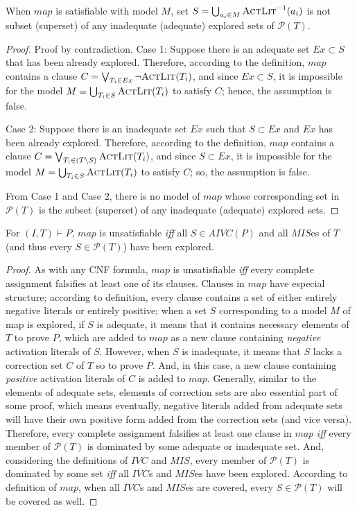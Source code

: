 \begin{lemma}
\label{lem:map:sound}
When $map$ is satisfiable with model $M$, set $S = \bigcup_{a_i \in M} \textsc{ActLit} ^{-1} (a_i)$ is not subset (superset) of any
inadequate (adequate) explored sets of $\mathcal{P}(T)$.
\end{lemma}
\begin{proof}
Proof by contradiction. Case 1: Suppose there is an adequate set $Ex \subset S$ that has been already explored. Therefore, according to the definition, $map$ contains a clause $C = \bigvee_{T_{i}\in Ex} \neg {\textsc{ActLit}(T_i)}$, and since $Ex \subset S$, it is impossible for the model $M = \bigcup_{T_i \in S} \textsc{ActLit} (T_i)$ to satisfy $C$; hence, the assumption is false.

Case 2: Suppose there is an inadequate set $Ex$ such that $S \subset Ex$ and $Ex$ has been already explored. Therefore, according to the definition, $map$ contains a clause $C = \bigvee_{T_{i}\in (T \setminus S)} \textsc{ActLit} (T_i)$, and since $S \subset Ex$, it is impossible for the model $M = \bigcup_{T_i \in S} \textsc{ActLit} (T_i)$ to satisfy $C$; so, the assumption is false.

From Case 1 and Case 2, there is no model of $map$ whose corresponding set in $\mathcal{P}(T)$ is the subset (superset) of any inadequate (adequate) explored sets.
\end{proof}


\begin{lemma}
\label{lem:map:comp}
For $(I, T) \vdash P$, $map$ is unsatisfiable \emph{iff} all $S \in AIVC(P)$ and all $MIS$es of $T$ (and thus every $S \in \mathcal{P}(T)$) have been explored.
\end{lemma}
\begin{proof}
As with any CNF formula, $map$ is unsatisfiable \emph{iff} every complete assignment falsifies at least one of its clauses. Clauses in $map$ have especial structure;
according to definition, every clause contains a set of either entirely negative literals or entirely positive; when a set $S$ corresponding to a model $M$ of map is explored, if $S$ is adequate, it means that it contains necessary elements of $T$ to prove $P$, which
are added to $map$ as a new clause containing \emph{negative} activation literals of $S$. However, when
$S$ is inadequate, it means that $S$ lacks a correction set $C$ of $T$ so to prove $P$.
And, in this case, a new clause containing \emph{positive} activation literals of $C$ is added to $map$. Generally, similar to the elements of adequate sets, elements of correction sets are also essential part of some proof, which means eventually, negative literals added from adequate sets will have their own  positive form added from the correction sets (and vice versa).
Therefore, every complete assignment falsifies at least one clause in $map$ \emph{iff} every
member of $\mathcal{P}(T)$ is dominated by some adequate or inadequate set.
And, considering the definitions of $IVC$ and $MIS$,  every member of $\mathcal{P}(T)$ is dominated by some set \emph{iff} all $IVC$s and $MIS$es have been explored. According to definition of $map$, when all $IVC$s and $MIS$es are covered, every $S \in \mathcal{P}(T)$ will be covered as well.
\end{proof}


